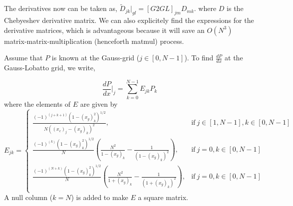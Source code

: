\documentclass{article}
\begin{document}
The derivatives now can be taken as, $\tilde{D}_{jk} \bigg|_{gl} = [G2GL]_{jm}D_{mk}$. where $D$ is the Chebyeshev derivative matrix. We can also explicitely find the expressions for the derivative matrices, which is advantageous because it will save an $O(N^{3})$ matrix-matrix-multiplication (henceforth matmul) process.

Assume that $P$ is known at the Gauss-grid ($j \in [0, N-1]$). To find $\frac{dP}{dx}$ at the Gauss-Lobatto grid, we write,

\begin{equation}\label{eq:dPdx_at_gl}
 \frac{dP}{dx}\bigg|_{j} = \sum_{k=0}^{N-1} E_{jk} P_{k}
\end{equation}
where the elements of $E$ are given by 
\begin{equation}
 E_{jk} = \begin{cases}
      \frac{(-1)^{(j + k + 1)} (1- (x_{g})_{k}^{2})^{1/2}}{N((x_{c})_{j} - (x_{g})_{k})^{2}}, & \text{if}\ j \in [1, N-1],   k \in [0, N-1] \\
      \frac{(-1)^{(k)} (1- (x_{g})_{k}^{2})^{1/2}}{N}\left( \frac{N^{2}}{1-(x_{g})_{k}} - \frac{1}{(1-(x_{g})_{k})^{2}}\right), & \text{if}\ j = 0,   k \in [0, N-1] \\
      \frac{(-1)^{(N+k)} (1- (x_{g})_{k}^{2})^{1/2}}{N}\left( \frac{N^{2}}{1+(x_{g})_{k}} - \frac{1}{(1+(x_{g})_{k})^{2}}\right), & \text{if}\ j = 0,   k \in [0, N-1] \\
    \end{cases}
\end{equation}
A null column ($k=N$) is added to make $E$ a square matrix. 
\end{document}

